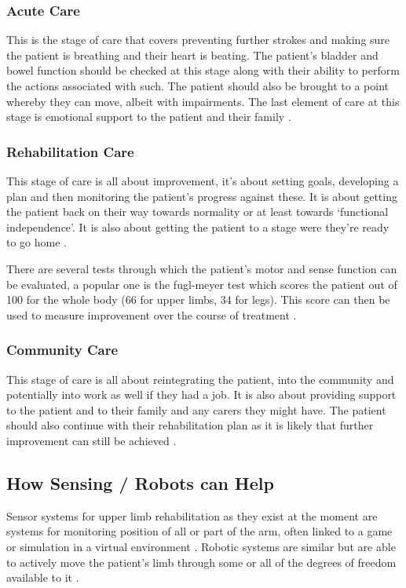 \documentclass[journal]{IEEEtran}
\begin{document}
\subsubsection{Acute Care}
This is the stage of care that covers preventing further strokes and making sure the 
patient is breathing and their heart is beating. The patient's bladder and bowel 
function should be checked at this stage along with their ability to perform the 
actions associated with such. The patient should also be brought to a point 
whereby they can move, albeit with impairments. The last element of care at 
this stage is emotional support to the patient and their family \cite{Physio}.

\subsubsection{Rehabilitation Care}
This stage of care is all about improvement, it's about setting goals, developing a plan 
and then monitoring the patient's progress against these. It is about getting the patient 
back on their way towards normality or at least towards `functional independence'. It is 
also about getting the patient to a stage were they're ready to go home \cite{Physio}.

There are several tests through which the patient's motor and sense function 
can be evaluated, a popular one is the fugl-meyer test which scores the patient 
out of 100 for the whole body (66 for upper limbs, 34 for legs). This score can 
then be used to measure improvement over the course of treatment \cite{fuglmeyer}.

\subsubsection{Community Care}
This stage of care is all about reintegrating the patient, into the community and potentially 
into work as well if they had a job. It is also about providing support to the patient and 
to their family and any carers they might have. The patient should also continue with 
their rehabilitation plan as it is likely that further improvement can still be achieved \cite{Physio}.

\subsection{How Sensing / Robots can Help}
Sensor systems for upper limb rehabilitation as they exist at the moment are systems for monitoring 
position of all or part of the arm, often linked to a game or simulation in a virtual environment \cite{AdvancesPush}.
Robotic systems are similar but are able to actively move the patient's limb through some or all 
of the degrees of freedom available to it \cite{AdvancesPush}.
\end{document}
